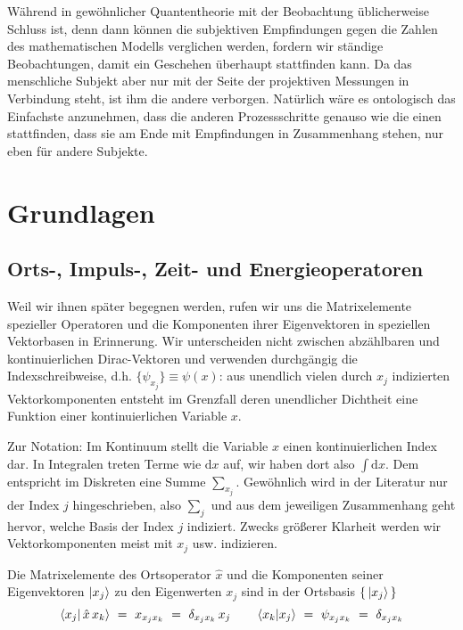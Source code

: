 \documentclass[12pt]{article}
\begin{document}
Während in gewöhnlicher Quantentheorie mit der Beobachtung üblicherweise Schluss ist, denn dann können die subjektiven Empfindungen gegen die Zahlen des mathematischen Modells verglichen werden, fordern wir ständige Beobachtungen, damit ein Geschehen überhaupt stattfinden kann. Da das menschliche Subjekt aber nur mit der Seite der projektiven Messungen in Verbindung steht, ist ihm die andere verborgen. Natürlich wäre es ontologisch das Einfachste anzunehmen, dass die anderen Prozessschritte genauso wie die einen stattfinden, dass sie am Ende mit Empfindungen in Zusammenhang stehen, nur eben für andere Subjekte. 

\section{Grundlagen}

\subsection{Orts-, Impuls-, Zeit- und Energieoperatoren}

Weil wir ihnen später begegnen werden, rufen wir uns die Matrixelemente spezieller Operatoren und die Komponenten ihrer Eigenvektoren in speziellen Vektorbasen in Erinnerung. Wir unterscheiden nicht zwischen abzählbaren und kontinuierlichen Dirac-Vektoren und verwenden durchgängig die Indexschreibweise, d.h. $\{\psi_{x_j}\} \equiv \psi(x)$: aus unendlich vielen durch $x_j$ indizierten Vektorkomponenten entsteht im Grenzfall deren unendlicher Dichtheit eine Funktion einer kontinuierlichen Variable $x$. 

Zur Notation: Im Kontinuum stellt die Variable $x$ einen kontinuierlichen Index dar. In Integralen treten Terme wie $\mathrm{d}x$ auf, wir haben dort also $\int\mathrm{d}x$. Dem entspricht im Diskreten eine Summe $\sum_{x_j}$. Gewöhnlich wird in der Literatur nur der Index $j$ hingeschrieben, also $\sum_j$ und aus dem jeweiligen Zusammenhang geht hervor, welche Basis der Index $j$ indiziert. Zwecks größerer Klarheit werden wir Vektorkomponenten meist mit $x_j$ usw. indizieren.

Die Matrixelemente des Ortsoperator $\hat{x}$ und die Komponenten seiner Eigenvektoren $\ket{x_j}$ zu den Eigenwerten $x_j$ sind in der Ortsbasis $\{\,\ket{x_j}\,\}$
\begin{equation}
\bra{x_j}\ket{\,\hat{x}\,x_k}\ =\ x_{x_j x_k}\ =\ \delta_{x_j x_k}\,x_j
\quad\quad 
\bra{x_k}\ket{x_j}\ =\ \psi_{x_j x_k}\ =\ \delta_{x_j x_k}
\end{equation}
\end{document}
